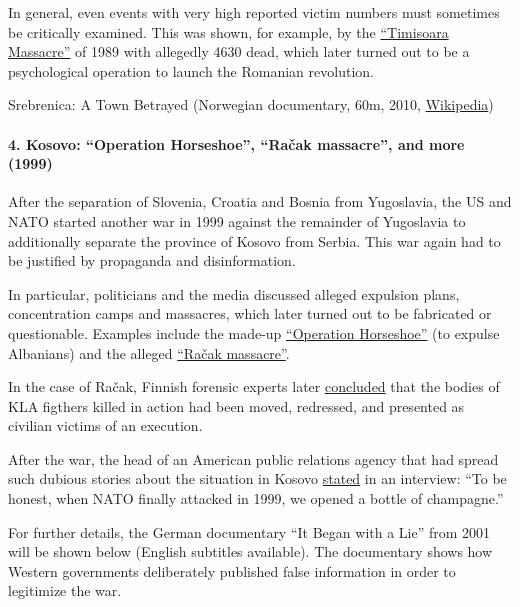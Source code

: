 In general, even events with very high reported victim numbers must
sometimes be critically examined. This was shown, for example, by the
\href{https://www.france24.com/en/20091220-twenty-years-later-timisoara-affair-exposes-media-credulity}{``Timisoara
Massacre''} of 1989 with allegedly 4630 dead, which later turned out to
be a psychological operation to launch the Romanian revolution.

Srebrenica: A Town Betrayed (Norwegian documentary, 60m, 2010,
\href{https://en.wikipedia.org/wiki/A_Town_Betrayed}{Wikipedia})

\hypertarget{4-kosovo-operation-horseshoe-raux10dak-massacre-and-more-1999}{%
\paragraph{4. Kosovo: ``Operation Horseshoe'', ``Račak massacre'', and
more
(1999)}\label{4-kosovo-operation-horseshoe-raux10dak-massacre-and-more-1999}}

After the separation of Slovenia, Croatia and Bosnia from Yugoslavia,
the US and NATO started another war in 1999 against the remainder of
Yugoslavia to additionally separate the province of Kosovo from Serbia.
This war again had to be justified by propaganda and disinformation.

In particular, politicians and the media discussed alleged expulsion
plans, concentration camps and massacres, which later turned out to be
fabricated or questionable. Examples include the made-up
\href{https://en.wikipedia.org/wiki/Operation_Horseshoe}{``Operation
Horseshoe''} (to expulse Albanians) and the alleged
\href{https://en.wikipedia.org/wiki/Ra\%C4\%8Dak_massacre}{``Račak
massacre''}.

In the case of Račak, Finnish forensic experts later
\href{https://swprs.files.wordpress.com/2019/12/racak-massacre_peter-worthington_toronto-sun_2001.pdf}{concluded}
that the bodies of KLA figthers killed in action had been moved,
redressed, and presented as civilian victims of an execution.

After the war, the head of an American public relations agency that had
spread such dubious stories about the situation in Kosovo
\href{https://www.hintergrund.de/globales/kriege/operation-balkan-werbung-fuer-krieg-und-tod/}{stated}
in an interview: ``To be honest, when NATO finally attacked in 1999, we
opened a bottle of champagne.''

For further details, the German documentary ``It Began with a Lie'' from
2001 will be shown below (English subtitles available). The documentary
shows how Western governments deliberately published false information
in order to legitimize the war.

